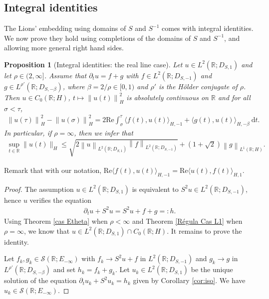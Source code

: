 \documentclass[11pt, letterpaper]{amsart}
\newtheorem{prop}[thm]{Proposition}
\theoremstyle{definition}
\theoremstyle{remark}
\numberwithin{equation}{section}
\begin{document}
{\subsection{Integral identities}\label{S2S4} 
The Lions' embedding using domains of $S$ and $S^{-1}$ comes with integral identities. 
We now prove they hold using completions of the domains of $S$ and $S^{-1}$, and allowing more general right hand sides.   
\begin{prop}[Integral identities: the real line case]\label{energy lemma}
    Let $u \in L^2(\mathbb{R};D_{S,1})$ and let $\rho \in (2,\infty]$. Assume that $\partial_t u =  f+g$ with $f \in L^2(\mathbb{R};D_{S,-1})$ and 
     $g \in L^{\rho'}(\mathbb{R};D_{S,-{\beta}})$, where ${\beta}={2}/{\rho} \in [0,1)$ and $\rho'$ is the H\"older conjugate of $\rho$. Then $ u \in C_0(\mathbb{R};H)$, $ t \mapsto \left \| u(t) \right \|^2_H$ is absolutely continuous on $\mathbb{R}$ and for all $ \sigma < \tau $,
    \begin{align}\label{eq:integralidentity}
        \left \| u(\tau) \right \|^2_H-\left \| u(\sigma) \right \|^2_H = 2\mathrm{Re}\int_{\sigma}^{\tau} \langle f(t),u(t)\rangle_{H,-1}  + \langle g(t),u(t)\rangle_{H, -\beta}\  \mathrm d t.
    \end{align}
    {In particular, if $\rho=\infty$, then we infer that 
    \begin{align}\label{important existence cas L1}
        \sup_{t\in \mathbb{R}}\|u(t) \|_{H} \leq \sqrt{2 \left\| u \right\|_{L^2(\mathbb{R};D_{S,1})} \left\| f \right\|_{L^2(\mathbb{R};D_{S,-1})} }+(1+\sqrt{2})\left\| g \right\|_{L^1(\mathbb{R};H)}.
    \end{align}}
\end{prop}

Remark that with our notation, $\mathrm{Re} \langle f(t),u(t)\rangle_{H,-1}= \mathrm{Re}  \langle u(t),f(t)\rangle_{H,1}$.



 
\begin{proof}
The assumption $u \in L^2(\mathbb{R};D_{S,1})$ is equivalent to $S^2u \in L^2(\mathbb{R}; D_{S,-1})$, hence $u$ verifies the equation 
\begin{align*}
    \partial_t u+S^2u =S^2u + f+g=: h.
\end{align*}
Using Theorem \ref{cas Etheta} when $\rho<\infty$ and Theorem \ref{Régula Cas L1} when $\rho=\infty$, we know that $u\in L^2(\mathbb{R};D_{S,1})\cap C_0(\mathbb{R};H)$. It remains to prove the identity. 

Let $f_k,g_k \in \mathcal{S}(\mathbb{R};E_{-\infty})$ with $f_k \to S^2u +f$ in $L^2(\mathbb{R};D_{S,-1})$ and $g_k \to g$ in  $ L^{\rho'}(\mathbb{R};D_{S,-{\beta}})$ and set $h_k=f_k+g_k$.
Let $u_k \in L^2(\mathbb{R};D_{S,1})$ be the unique solution of the equation $\partial_t u_k + S^2 u_k = h_k$ given by Corollary \ref{cor:iso}.  We have $u_k \in \mathcal{S}(\mathbb{R};E_{-\infty})$.


\end{proof}}
\end{document}
